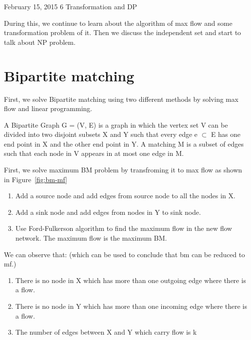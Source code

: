 \documentclass[usletter]{article}
\begin{document}
           {February 15, 2015}                          %
           {6}                                       %
           {Transformation  and DP}  %

\noindent
During this, we continue to learn about the algorithm of max flow and some transformation problem of it. Then we discuss the independent set and start to talk about NP problem.  

\section{Bipartite matching}
First, we solve Bipartite matching using two different methods by solving max flow and linear programming.

A Bipartite Graph G = (V, E) is a graph in which the vertex set V can be divided into two disjoint subsets X and Y such that every edge e $\subset$ E has one end point in X and the other end point in Y. A matching M is a subset of edges such that each node in V appears in at most one edge in M.

First, we solve maximum BM problem by transfroming it to max flow as shown in  Figure~\ref{fig:bm-mf}
\begin{enumerate}
	\item Add a source node and add edges from source node to all the nodes in X.\item Add a sink node and add edges from nodes in Y to sink node.
	\item Use Ford-Fulkerson algorithm to find the maximum flow in the new flow network. The maximum flow is the maximum BM.
\end{enumerate}

We can observe that: (which can be used to conclude that bm can be reduced to mf.)
\begin{enumerate}
	\item There is no node in X which has more than one outgoing edge where there is a flow.
	\item There is no node in Y which has more than one incoming edge where there is a flow.
	\item  The number of edges between X and Y which carry flow is k
\end{enumerate}
\end{document}
